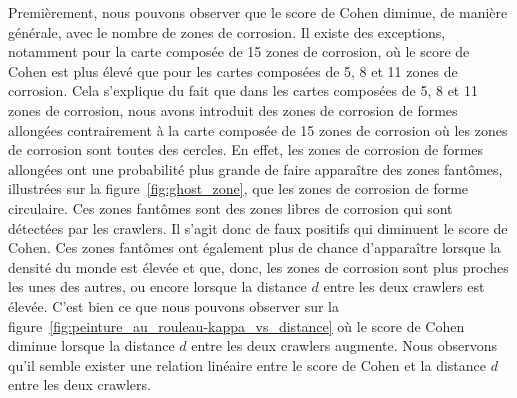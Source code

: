 \documentclass[english,RandD]{rapportPFE}  %
\begin{document}
			Premièrement, nous pouvons observer que le score de Cohen diminue, de manière générale, avec le nombre de zones de corrosion.
			Il existe des exceptions, notamment pour la carte composée de 15 zones de corrosion, où le score de Cohen est plus élevé que pour les cartes composées de 5, 8 et 11 zones de corrosion.
			Cela s'explique du fait que dans les cartes composées de 5, 8 et 11 zones de corrosion, nous avons introduit des zones de corrosion de formes allongées contrairement à la carte composée de 15 zones de corrosion où les zones de corrosion sont toutes des cercles.
			En effet, les zones de corrosion de formes allongées ont une probabilité plus grande de faire apparaître des zones fantômes, illustrées sur la figure~\ref{fig:ghost_zone}, que les zones de corrosion de forme circulaire.
			Ces zones fantômes sont des zones libres de corrosion qui sont détectées par les crawlers.
			Il s'agit donc de faux positifs qui diminuent le score de Cohen.
			Ces zones fantômes ont également plus de chance d'apparaître lorsque la densité du monde est élevée et que, donc, les zones de corrosion sont plus proches les unes des autres, ou encore lorsque la distance $d$ entre les deux crawlers est élevée.
			C'est bien ce que nous pouvons observer sur la figure~\ref{fig:peinture_au_rouleau-kappa_vs_distance} où le score de Cohen diminue lorsque la distance $d$ entre les deux crawlers augmente.
			Nous observons qu'il semble exister une relation linéaire entre le score de Cohen et la distance $d$ entre les deux crawlers.
\end{document}
